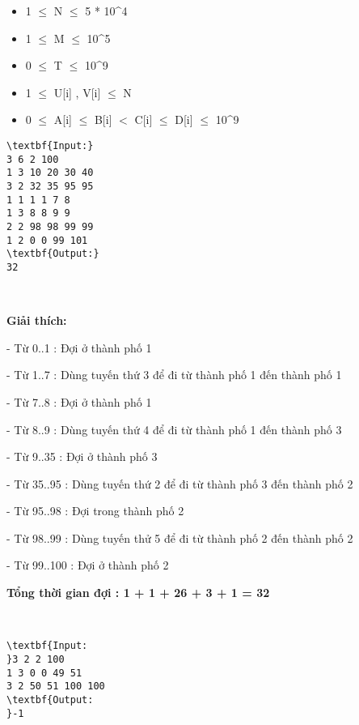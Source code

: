 \begin{itemize}
	\item 1  $\le$  N  $\le$  5 * 10^4
	\item 1  $\le$  M  $\le$  10^5
	\item 0  $\le$  T  $\le$  10^9
	\item 1  $\le$  U[i] , V[i]  $\le$  N
	\item 0  $\le$  A[i]  $\le$  B[i] $<$ C[i]  $\le$  D[i]  $\le$  10^9
\end{itemize}
\begin{verbatim}
\textbf{Input:}
3 6 2 100
1 3 10 20 30 40
3 2 32 35 95 95
1 1 1 1 7 8
1 3 8 8 9 9
2 2 98 98 99 99
1 2 0 0 99 101
\textbf{Output:}
32\end{verbatim}

 

\textbf{Giải thích:}


- Từ 0..1 : Đợi ở thành phố 1


- Từ 1..7 : Dùng tuyến thứ 3 để đi từ thành phố 1 đến thành phố 1


- Từ 7..8 : Đợi ở thành phố 1


- Từ 8..9 : Dùng tuyến thứ 4 để đi từ thành phố 1 đến thành phố 3


- Từ 9..35 : Đợi ở thành phố 3


- Từ 35..95 : Dùng tuyến thứ 2 để đi từ thành phố 3 đến thành phố 2


- Từ 95..98 : Đợi trong thành phố 2


- Từ 98..99 : Dùng tuyến thử 5 để đi từ thành phố 2 đến thành phố 2


- Từ 99..100 : Đợi ở thành phố 2


\textbf{Tổng thời gian đợi : 1 + 1 + 26 + 3 + 1 = 32}

 
\begin{verbatim}
\textbf{Input:
}3 2 2 100
1 3 0 0 49 51
3 2 50 51 100 100
\textbf{Output:
}-1
\end{verbatim}